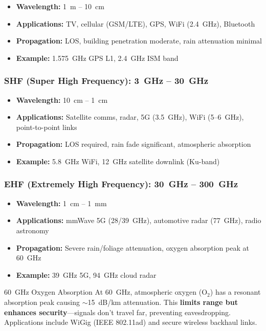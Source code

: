 \begin{itemize}
\item \textbf{Wavelength:} 1~m -- 10~cm
\item \textbf{Applications:} TV, cellular (GSM/LTE), GPS, WiFi (2.4~GHz), Bluetooth
\item \textbf{Propagation:} LOS, building penetration moderate, rain attenuation minimal
\item \textbf{Example:} 1.575~GHz GPS L1, 2.4~GHz ISM band
\end{itemize}

\subsubsection{SHF (Super High Frequency): 3~GHz -- 30~GHz}

\begin{itemize}
\item \textbf{Wavelength:} 10~cm -- 1~cm
\item \textbf{Applications:} Satellite comms, radar, 5G (3.5~GHz), WiFi (5--6~GHz), point-to-point links
\item \textbf{Propagation:} LOS required, rain fade significant, atmospheric absorption
\item \textbf{Example:} 5.8~GHz WiFi, 12~GHz satellite downlink (Ku-band)
\end{itemize}

\subsubsection{EHF (Extremely High Frequency): 30~GHz -- 300~GHz}

\begin{itemize}
\item \textbf{Wavelength:} 1~cm -- 1~mm
\item \textbf{Applications:} mmWave 5G (28/39~GHz), automotive radar (77~GHz), radio astronomy
\item \textbf{Propagation:} Severe rain/foliage attenuation, oxygen absorption peak at 60~GHz
\item \textbf{Example:} 39~GHz 5G, 94~GHz cloud radar
\end{itemize}

\begin{calloutbox}{60~GHz Oxygen Absorption}
At 60~GHz, atmospheric oxygen (O$_2$) has a resonant absorption peak causing $\sim$15~dB/km attenuation. This \textbf{limits range but enhances security}---signals don't travel far, preventing eavesdropping. Applications include WiGig (IEEE 802.11ad) and secure wireless backhaul links.
\end{calloutbox}

